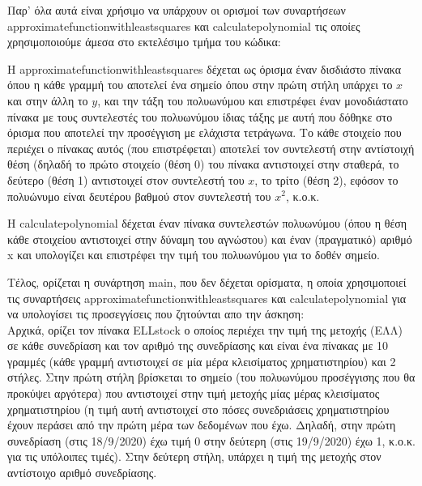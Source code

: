 \documentclass[a4paper,11pt]{article}
\newcommand{\lt}{\latintext}
\begin{document}
\par
Παρ' όλα αυτά είναι χρήσιμο να υπάρχουν οι ορισμοί των συναρτήσεων {\lt approximate\textunderscore function\textunderscore with\textunderscore least\textunderscore squares} και {\lt calculate\textunderscore polynomial} τις οποίες χρησιμοποιούμε άμεσα στο εκτελέσιμο τμήμα του κώδικα:
\par
Η  {\lt approximate\textunderscore function\textunderscore with\textunderscore least\textunderscore squares} δέχεται ως όρισμα έναν δισδιάστο πίνακα όπου η κάθε γραμμή του αποτελεί ένα σημείο όπου στην πρώτη στήλη υπάρχει το {\lt $x$} και στην άλλη το {\lt $y$}, και την τάξη του πολυωνύμου και επιστρέφει έναν μονοδιάστατο πίνακα με τους συντελεστές του πολυωνύμου ίδιας τάξης με αυτή που δόθηκε στο όρισμα που αποτελεί την προσέγγιση με ελάχιστα τετράγωνα. Tο κάθε στοιχείο που περιέχει ο πίνακας αυτός (που επιστρέφεται) αποτελεί τον συντελεστή στην αντίστοιχή θέση (δηλαδή το πρώτο στοιχείο (θέση 0) του πίνακα αντιστοιχεί στην σταθερά, το δεύτερο (θέση 1) αντιστοιχεί στον συντελεστή του {\lt $x$}, το τρίτο (θέση 2), εφόσον το πολυώνυμο είναι δευτέρου βαθμού στον συντελεστή του {\lt $x^2$}, κ.ο.κ.
\par
H {\lt calculate\textunderscore polynomial} δέχεται έναν πίνακα συντελεστών πολυωνύμου (όπου η θέση κάθε στοιχείου αντιστοιχεί στην δύναμη του αγνώστου) και έναν (πραγματικό) αριθμό {\lt x} και υπολογίζει και επιστρέφει την τιμή του πολυωνύμου για το δοθέν σημείο.\\

\par
Τέλος, ορίζεται η συνάρτηση {\lt main}, που δεν δέχεται ορίσματα, η οποία χρησιμοποιεί τις συναρτήσεις {\lt approximate\textunderscore function\textunderscore with\textunderscore least\textunderscore squares} και {\lt calculate\textunderscore polynomial} για να υπολογίσει τις προσεγγίσεις που ζητούνται απο την άσκηση:\\

Αρχικά, ορίζει τον πίνακα {\lt ELL\textunderscore stock} ο οποίος περιέχει την τιμή της μετοχής (ΕΛΛ) σε κάθε συνεδρίαση και τον αριθμό της συνεδρίασης και είναι ένα πίνακας με 10 γραμμές (κάθε γραμμή αντιστοιχεί σε μία μέρα κλεισίματος χρηματιστηρίου) και 2 στήλες. Στην πρώτη στήλη βρίσκεται το σημείο (του πολυωνύμου προσέγγισης που θα προκύψει αργότερα) που αντιστοιχεί στην τιμή μετοχής μίας μέρας κλεισίματος χρηματιστηρίου (η τιμή αυτή αντιστοιχεί στο πόσες συνεδριάσεις  χρηματιστηρίου έχουν περάσει από την πρώτη μέρα των δεδομένων που έχω. Δηλαδή, στην πρώτη συνεδρίαση (στις 18/9/2020) έχω τιμή 0 στην δεύτερη (στις 19/9/2020) έχω 1, κ.ο.κ. για τις υπόλοιπες τιμές). Στην δεύτερη στήλη, υπάρχει η τιμή της μετοχής στον αντίστοιχο αριθμό συνεδρίασης.\\
\end{document}
